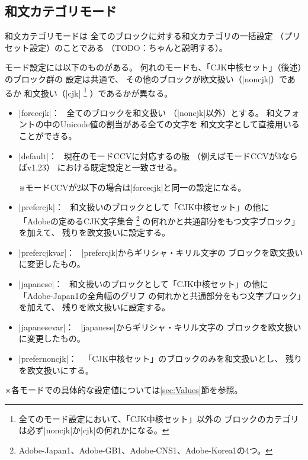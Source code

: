 \documentclass[uplatex,dvipdfmx,a4paper]{jsarticle}
\newcommand{\Note}{\par\noindent ※}
\newcommand{\Means}{：~}
\newcommand{\strong}{\textsf}
\begin{document}
\subsection{和文カテゴリモード}
\label{ssec:cjkcategory-mode}

\strong{和文カテゴリモード}は
全てのブロックに対する和文カテゴリの一括設定
（プリセット設定）のことである
（TODO：ちゃんと説明する）。

モード設定には以下のものがある。
何れのモードも、「CJK中核セット」（後述）のブロック群の
設定は共通で、
その他のブロックが欧文扱い（|noncjk|）であるか
和文扱い（|cjk|%
\footnote{全てのモード設定において、「CJK中核セット」\strong{以外}の
  ブロックのカテゴリは必ず|noncjk|か|cjk|の何れかになる。}%
）であるかが異なる。
\begin{itemize}
\item |forcecjk|\Means
  全てのブロックを和文扱い
  （|noncjk|以外）とする。
  和文フォントの中のUnicode値の割当がある全ての文字を
  和文文字として直接用いることができる。
\item |default|\Means
  現在のモードCCVに対応する{\upTeX}の版
  （例えばモードCCVが3ならばv1.23）
  における既定設定と一致させる。
  \Note モードCCVが2以下の場合は|forcecjk|と同一の設定になる。
\item |prefercjk|\Means
  和文扱いのブロックとして「CJK中核セット」の他に
  「Adobeの定めるCJK文字集合
  \footnote{Adobe-Japan1、Adobe-GB1、Adobe-CNS1、Adobe-Korea1の4つ。}%
  の何れかと共通部分をもつ文字ブロック」を加えて、
  残りを欧文扱いに設定する。
\item |prefercjkvar|\Means\hspace{-.25em}%
  |prefercjk|からギリシャ・キリル文字の
  ブロックを欧文扱いに変更したもの。
\item |japanese|\Means
  和文扱いのブロックとして「CJK中核セット」の他に
  「Adobe-Japan1の全角幅のグリフ
  の何れかと共通部分をもつ文字ブロック」を加えて、
  残りを欧文扱いに設定する。
\item |japanesevar|\Means
  |japanese|からギリシャ・キリル文字の
  ブロックを欧文扱いに変更したもの。
\item |prefernoncjk|\Means
  「CJK中核セット」のブロックのみを和文扱いとし、
  残りを欧文扱いにする。
\end{itemize}

\Note 各モードでの具体的な設定値については\ref{sec:Values}節を参照。
\end{document}

